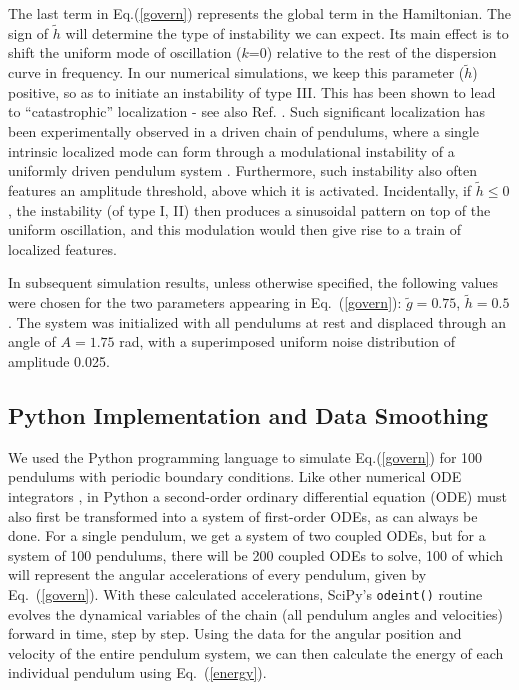\documentclass[11pt]{article}
\begin{document}
The last term in Eq.(\ref{govern}) represents the global term in the Hamiltonian. The sign of $\tilde{h}$ will determine the type of instability we can expect. Its main effect is to shift the uniform mode of oscillation ($k$=0) relative to the rest of the dispersion curve in frequency. In our numerical simulations, we keep this parameter ($\tilde{h}$) positive, so as to initiate an instability of type III. This has been shown to lead to ``catastrophic'' localization - see also Ref. \cite{english2003modulational}. Such significant localization has been experimentally observed in a driven chain of pendulums, where a single intrinsic localized mode can form through a modulational instability of a uniformly driven pendulum system \cite{thakur2007driven, cuevas2009discrete}. Furthermore, such instability also often features an amplitude threshold, above which it is activated. Incidentally, if $\tilde{h}\leq 0$, the instability (of type I, II) then produces a sinusoidal pattern on top of the uniform oscillation, and this modulation would then give rise to a train of localized features.
 
In subsequent simulation results, unless otherwise specified, the following values were chosen for the two parameters appearing in Eq.~(\ref{govern}):
$\tilde{g}=0.75$, $\tilde{h}=0.5$. The system was initialized with all pendulums at rest and displaced through an angle of $A=1.75$ rad, with a superimposed uniform noise distribution of amplitude 0.025.

\subsection{Python Implementation and Data Smoothing}

We used the Python programming language to simulate Eq.(\ref{govern}) for 100 pendulums with periodic boundary conditions. 
Like other numerical ODE integrators \cite{press1992numerical}, in Python a second-order ordinary differential equation (ODE) must also first be transformed into a system of first-order ODEs, as can always be done. For a single pendulum, we get a system of two coupled ODEs, but for a system of 100 pendulums, there will be 200 coupled ODEs to solve, 100 of which will represent the angular accelerations of every pendulum, given by Eq.~(\ref{govern}).  
With these calculated accelerations, SciPy's \texttt{odeint()} routine evolves the dynamical variables of the chain (all pendulum angles and velocities) forward in time, step by step. Using the data for the angular position and velocity of the entire pendulum system, we can then calculate the energy of each individual pendulum using Eq.~(\ref{energy}).
\end{document}
